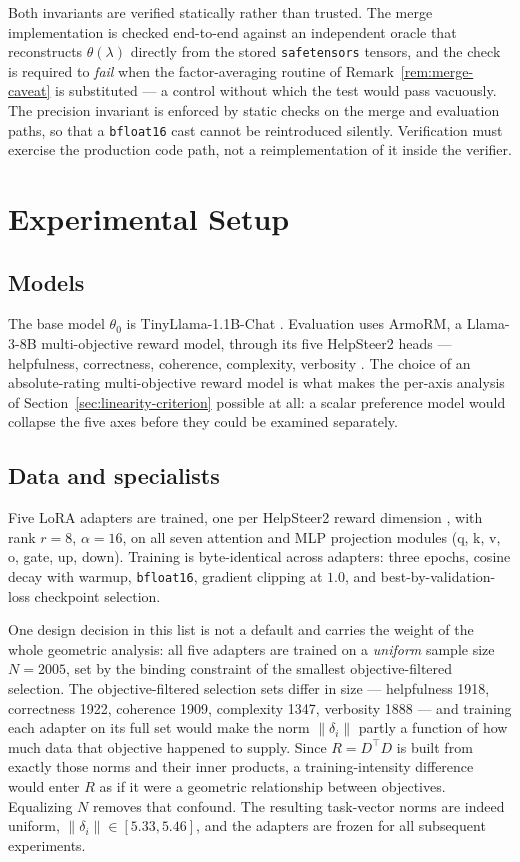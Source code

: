 \documentclass[12pt,a4paper]{report}
\newcommand{\1}{\mathbf{1}}
\newcommand{\norm}[1]{\left\lVert #1 \right\rVert}
\theoremstyle{definition}
\begin{document}
Both invariants are verified statically rather than trusted. The merge implementation is checked end-to-end against an independent oracle that reconstructs \(\theta(\lambda)\) directly from the stored \texttt{safetensors} tensors, and the check is required to \emph{fail} when the factor-averaging routine of Remark~\ref{rem:merge-caveat} is substituted --- a control without which the test would pass vacuously. The precision invariant is enforced by static checks on the merge and evaluation paths, so that a \texttt{bfloat16} cast cannot be reintroduced silently. Verification must exercise the production code path, not a reimplementation of it inside the verifier.

\chapter{Experimental Setup}
\label{chap:setup}

\section{Models}

The base model \(\theta_0\) is TinyLlama-1.1B-Chat \citep{zhang2024tinyllama}. Evaluation uses ArmoRM, a Llama-3-8B multi-objective reward model, through its five HelpSteer2 heads --- helpfulness, correctness, coherence, complexity, verbosity \citep{wang2024armorm}. The choice of an absolute-rating multi-objective reward model is what makes the per-axis analysis of Section~\ref{sec:linearity-criterion} possible at all: a scalar preference model would collapse the five axes before they could be examined separately.

\section{Data and specialists}
\label{sec:specialists}

Five LoRA adapters are trained, one per HelpSteer2 reward dimension \citep{wang2024helpsteer2}, with rank \(r=8\), \(\alpha=16\), on all seven attention and MLP projection modules (q, k, v, o, gate, up, down). Training is byte-identical across adapters: three epochs, cosine decay with warmup, \texttt{bfloat16}, gradient clipping at \(1.0\), and best-by-validation-loss checkpoint selection.

One design decision in this list is not a default and carries the weight of the whole geometric analysis: all five adapters are trained on a \emph{uniform} sample size \(N=2005\), set by the binding constraint of the smallest objective-filtered selection. The objective-filtered selection sets differ in size --- helpfulness 1918, correctness 1922, coherence 1909, complexity 1347, verbosity 1888 --- and training each adapter on its full set would make the norm \(\norm{\delta_i}\) partly a function of how much data that objective happened to supply. Since \(R=D^\top D\) is built from exactly those norms and their inner products, a training-intensity difference would enter \(R\) as if it were a geometric relationship between objectives. Equalizing \(N\) removes that confound. The resulting task-vector norms are indeed uniform, \(\norm{\delta_i}\in[5.33,5.46]\), and the adapters are frozen for all subsequent experiments.
\end{document}
